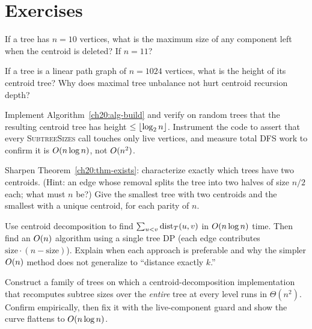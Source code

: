 \section{Exercises}
\label{ch20:exercises}

\begin{exercise}
If a tree has $n=10$ vertices, what is the maximum size of any component left when the centroid is deleted? If $n=11$?
\end{exercise}

\begin{exercise}
If a tree is a linear path graph of $n=1024$ vertices, what is the height of its centroid tree? Why does maximal tree unbalance not hurt centroid recursion depth?
\end{exercise}

\begin{exercise}
Implement Algorithm~\ref{ch20:alg-build} and verify on random trees that the
resulting centroid tree has height $\le\lfloor\log_2 n\rfloor$. Instrument the code to
assert that every \textsc{SubtreeSizes} call touches only live vertices, and
measure total DFS work to confirm it is $O(n\log n)$, not $O(n^2)$.
\end{exercise}

\begin{exercise}
Sharpen Theorem~\ref{ch20:thm-exists}: characterize exactly which trees have two
centroids. (Hint: an edge whose removal splits the tree into two halves of size
$n/2$ each; what must $n$ be?) Give the smallest tree with two centroids and the
smallest with a unique centroid, for each parity of $n$.
\end{exercise}

\begin{exercise}
Use centroid decomposition to find $\sum_{u<v}\operatorname{dist}_T(u,v)$ in $O(n\log n)$ time.
Then find an $O(n)$ algorithm using a single tree DP (each edge contributes
$\mathrm{size}\cdot(n-\mathrm{size})$). Explain when each approach is preferable and
why the simpler $O(n)$ method does not generalize to ``distance exactly $k$.''
\end{exercise}

\begin{exercise}
Construct a family of trees on which a centroid-decomposition implementation that
recomputes subtree sizes over the \emph{entire} tree at every level runs in
$\Theta(n^2)$. Confirm empirically, then fix it with the live-component guard and
show the curve flattens to $O(n\log n)$.
\end{exercise}

